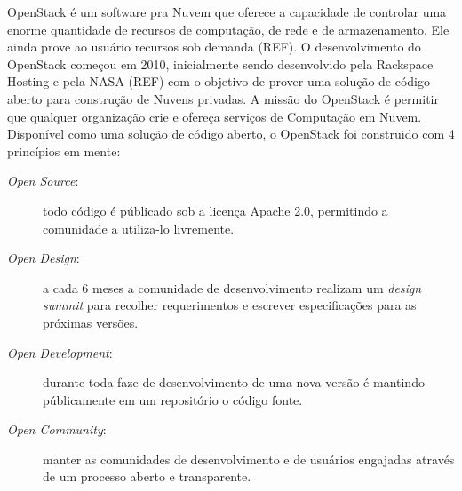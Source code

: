 OpenStack é um software pra Nuvem que oferece a capacidade de controlar uma enorme quantidade de recursos de computação, de rede e de armazenamento. Ele ainda prove ao usuário recursos sob demanda (REF). O desenvolvimento do OpenStack começou em 2010, inicialmente sendo desenvolvido pela Rackspace Hosting e pela NASA (REF) com o objetivo de prover uma solução de código aberto para construção de Nuvens privadas. A missão do OpenStack é permitir que qualquer organização crie e ofereça serviços de Computação em Nuvem. Disponível como uma solução de código aberto, o OpenStack foi construido com 4 princípios em mente:

\begin{description}

	\item[\textit{Open Source}:] todo código é públicado sob a licença Apache 2.0, permitindo a comunidade a utiliza-lo livremente.

	\item[\textit{Open Design}:] a cada 6 meses a comunidade de desenvolvimento realizam um \textit{design summit} para recolher requerimentos e escrever especificações para as próximas versões.

	\item[\textit{Open Development}:] durante toda faze de desenvolvimento de uma nova versão é mantindo públicamente em um repositório o código fonte.

	\item[\textit{Open Community}:] manter as comunidades  de desenvolvimento e de usuários engajadas através de um processo aberto e transparente.   

\end{description}

